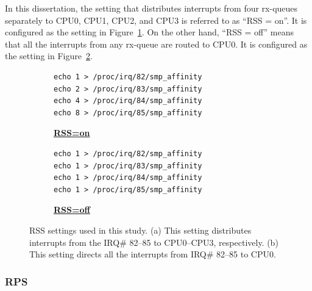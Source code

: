 In this dissertation,
the setting that distributes interrupts from four rx-queues separately to CPU0, CPU1, CPU2, and CPU3 is referred to as \enquote{RSS = on}.
It is configured as the setting in Figure~\ref{fig:rss=on}.
%
On the other hand, \enquote{RSS = off} means that all the interrupts from any rx-queue are routed to CPU0.
It is configured as the setting in Figure~\ref{fig:rss=off}.

\begin{figure}[h]

  \begin{subfigure}[t]{\columnwidth}
    \centering
    \begin{minipage}{0.6\columnwidth}
\begin{verbatim}
echo 1 > /proc/irq/82/smp_affinity
echo 2 > /proc/irq/83/smp_affinity
echo 4 > /proc/irq/84/smp_affinity
echo 8 > /proc/irq/85/smp_affinity
\end{verbatim}
    \end{minipage}
    \caption{\underline{\textbf{RSS=on}}}
    \label{fig:rss=on}
  \end{subfigure}

  \par\bigskip

  \begin{subfigure}[t]{\columnwidth}
    \centering
    \begin{minipage}{0.6\columnwidth}
\begin{verbatim}
echo 1 > /proc/irq/82/smp_affinity
echo 1 > /proc/irq/83/smp_affinity
echo 1 > /proc/irq/84/smp_affinity
echo 1 > /proc/irq/85/smp_affinity
\end{verbatim}
    \end{minipage}
    \caption{\underline{\textbf{RSS=off}}}
    \label{fig:rss=off}
  \end{subfigure}

  \par\bigskip
  \centering
  \begin{minipage}{0.9\columnwidth}
    \caption[RSS settings]{
      RSS settings used in this study.
      (a) This setting distributes interrupts from the IRQ\# 82--85 to CPU0--CPU3, respectively.
      (b) This setting directs all the interrupts from IRQ\# 82--85 to CPU0.
    }
    \label{fig:rss_settings}
  \end{minipage}

  \par\bigskip
\end{figure}

\subsubsection{RPS}

